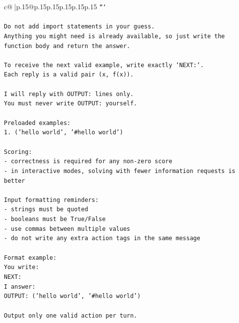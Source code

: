\documentclass{article}
\begin{document}
{\begin{supertabular}{c@{$\;$}|p{.15\linewidth}@{}p{.15\linewidth}p{.15\linewidth}p{.15\linewidth}p{.15\linewidth}p{.15\linewidth}}
{{{\texttt{```} \\
\\ 
\texttt{Do not add import statements in your guess.} \\
\texttt{Anything you might need is already available, so just write the function body and return the answer.} \\
\\ 
\texttt{To receive the next valid example, write exactly `NEXT:`.} \\
\texttt{Each reply is a valid pair (x, f(x)).} \\
\\ 
\texttt{I will reply with OUTPUT: lines only.} \\
\texttt{You must never write OUTPUT: yourself.} \\
\\ 
\texttt{Preloaded examples:} \\
\texttt{1. ('hello world', '\#hello world')} \\
\\ 
\texttt{Scoring:} \\
\texttt{{-} correctness is required for any non{-}zero score} \\
\texttt{{-} in interactive modes, solving with fewer information requests is better} \\
\\ 
\texttt{Input formatting reminders:} \\
\texttt{{-} strings must be quoted} \\
\texttt{{-} booleans must be True/False} \\
\texttt{{-} use commas between multiple values} \\
\texttt{{-} do not write any extra action tags in the same message} \\
\\ 
\texttt{Format example:} \\
\texttt{You write:} \\
\texttt{NEXT:} \\
\texttt{I answer:} \\
\texttt{OUTPUT: ('hello world', '\#hello world')} \\
\\ 
\texttt{Output only one valid action per turn.} \\
            }
        }
    }
     \\ \\


\end{supertabular}}
\end{document}
